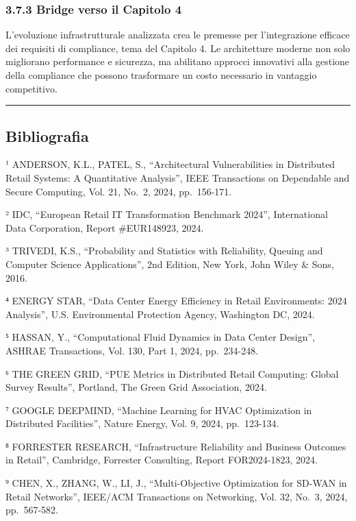 \documentclass{report}
\begin{document}
\subsubsection{3.7.3 Bridge verso il Capitolo
4}\label{bridge-verso-il-capitolo-4}

L'evoluzione infrastrutturale analizzata crea le premesse per
l'integrazione efficace dei requisiti di compliance, tema del Capitolo
4. Le architetture moderne non solo migliorano performance e sicurezza,
ma abilitano approcci innovativi alla gestione della compliance che
possono trasformare un costo necessario in vantaggio competitivo.

\begin{center}\rule{0.5\linewidth}{0.5pt}\end{center}

\subsection{Bibliografia}\label{bibliografia}

¹ ANDERSON, K.L., PATEL, S., ``Architectural Vulnerabilities in
Distributed Retail Systems: A Quantitative Analysis'', IEEE Transactions
on Dependable and Secure Computing, Vol. 21, No.~2, 2024, pp.~156-171.

² IDC, ``European Retail IT Transformation Benchmark 2024'',
International Data Corporation, Report \#EUR148923, 2024.

³ TRIVEDI, K.S., ``Probability and Statistics with Reliability, Queuing
and Computer Science Applications'', 2nd Edition, New York, John Wiley
\& Sons, 2016.

⁴ ENERGY STAR, ``Data Center Energy Efficiency in Retail Environments:
2024 Analysis'', U.S. Environmental Protection Agency, Washington DC,
2024.

⁵ HASSAN, Y., ``Computational Fluid Dynamics in Data Center Design'',
ASHRAE Transactions, Vol. 130, Part 1, 2024, pp.~234-248.

⁶ THE GREEN GRID, ``PUE Metrics in Distributed Retail Computing: Global
Survey Results'', Portland, The Green Grid Association, 2024.

⁷ GOOGLE DEEPMIND, ``Machine Learning for HVAC Optimization in
Distributed Facilities'', Nature Energy, Vol. 9, 2024, pp.~123-134.

⁸ FORRESTER RESEARCH, ``Infrastructure Reliability and Business Outcomes
in Retail'', Cambridge, Forrester Consulting, Report FOR2024-1823, 2024.

⁹ CHEN, X., ZHANG, W., LI, J., ``Multi-Objective Optimization for SD-WAN
in Retail Networks'', IEEE/ACM Transactions on Networking, Vol. 32,
No.~3, 2024, pp.~567-582.
\end{document}

